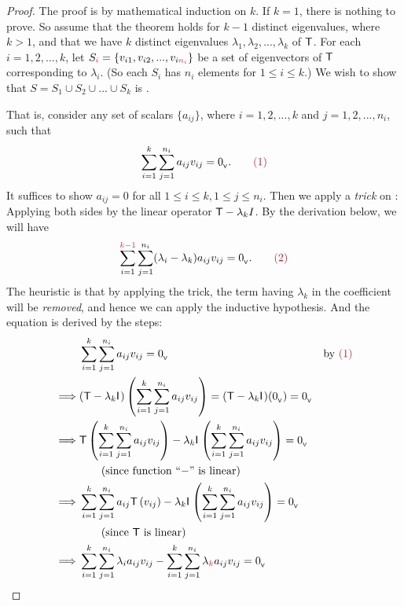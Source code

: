\begin{proof}
The proof is by mathematical induction on \(k\).
If \(k = 1\), there is nothing to prove.
So assume that the theorem holds for \(k - 1\) distinct eigenvalues, where \(k > 1\), and that we have \(k\) distinct eigenvalues \(\lambda_1, \lambda_2, ..., \lambda_k\) of \(\textsf{T}\).
For each \(i = 1, 2, ..., k\), let \(S_{\RED{i}} = \{ v_{i1}, v_{i2}, ..., v_{i\RED{n_i}} \}\) be a \LID{} set of eigenvectors of \(\textsf{T}\) corresponding to \(\lambda_i\).
(So each \(S_i\) has \(n_i\) elements for \(1 \le i \le k\).)
We wish to show that \(S = S_1 \cup S_2 \cup ... \cup S_k\) is \LID{}.

That is, consider any set of scalars \(\{ a_{ij} \}\), where \(i = 1, 2, ... , k\) and \(j = 1, 2, ..., n_i\), such that
\[
    \sum_{i = 1}^k \sum_{j = 1}^{n_i} a_{ij} v_{ij} = \OV. \quad \quad \MAROON{(1)}
\]
It suffices to show \(a_{ij} = 0\) for all \(1 \le i \le k, 1 \le j \le n_i\).
Then we apply a \emph{trick} on : Applying both sides by the linear operator \(\textsf{T} - \lambda_k I\).
By the derivation below, we will have
\[
    \sum_{i = 1}^{\RED{k - 1}} \sum_{j = 1}^{n_i} (\lambda_i - \lambda_k) a_{ij} v_{ij} = \OV. \quad \quad \MAROON{(2)}
\]
The heuristic is that by applying the trick, the term having \(\lambda_k\) in the coefficient will be \emph{removed}, and hence we can apply the inductive hypothesis.
And the equation is derived by the steps:
\begin{align*}
             & \sum_{i = 1}^k \sum_{j = 1}^{n_i} a_{ij} v_{ij} = \OV & \text{by \MAROON{(1)}} \\
    \implies & (\T - \lambda_k \ITRAN{})\left( \sum_{i = 1}^k \sum_{j = 1}^{n_i} a_{ij} v_{ij} \right) = (\T - \lambda_k \ITRAN{})(\OV) = \OV \\
    \implies & \T \left( \sum_{i = 1}^k \sum_{j = 1}^{n_i} a_{ij} v_{ij} \right) - \lambda_k \ITRAN{} \left( \sum_{i = 1}^k \sum_{j = 1}^{n_i} a_{ij} v_{ij} \right) = \OV \\
             & \quad \quad \text{(since function ``\(-\)'' is linear)} \\
    \implies & \sum_{i = 1}^k \sum_{j = 1}^{n_i} a_{ij} \T \left( v_{ij} \right) - \lambda_k \ITRAN{} \left( \sum_{i = 1}^k \sum_{j = 1}^{n_i} a_{ij} v_{ij} \right) = \OV \\
             & \quad \quad \text{(since \(\T\) is linear)} \\
    \implies & \sum_{i = 1}^k \sum_{j = 1}^{n_i} \lambda_i a_{ij} v_{ij} - \sum_{i = 1}^k \sum_{j = 1}^{n_i} \lambda_{\RED{k}} a_{ij} v_{ij} = \OV \\

\end{align*}
\end{proof}
